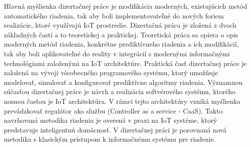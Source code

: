 Hlavná myšlienka dizertačnej práce je modifikácia moderných, existujúcich metód automatického riadenia, tak aby boli implementovateľné do nových foriem realizácie, ktoré využívajú IoT prostredie. Dizertačná práca je zložená z dvoch základných častí a to teoretickej a praktickej. Teoretická práca sa opiera o opis moderných metód riadenia, konkrétne prediktívneho riadenia a ich modifikácií, tak aby boli aplikovateľné do reality v integrácií s modernými informačnými technológiami založenými na IoT architektúre. Praktická časť dizertačnej práce je založená na vývoji všeobecného programového systému, ktorý umožňuje modelovať, simulovať a konfigurovať prediktívne algoritmy riadenia. Významnou súčasťou dizertačnej práce je návrh a realizácia softvérového systému, ktorého nosnou časťou je IoT architektúra. V rámci tejto architektúry vzniká myšlienka prevádzkovať regulátor ako službu (Controller as a service - CaaS). Takto navrhovaná metodika riadenia je overená v praxi na IoT systéme, ktorý predstavuje inteligentnú domácnosť. V  dizertačnej práci je porovnaná nová metodika s klasickým prístupom k informačnému systému pre riadenie. 